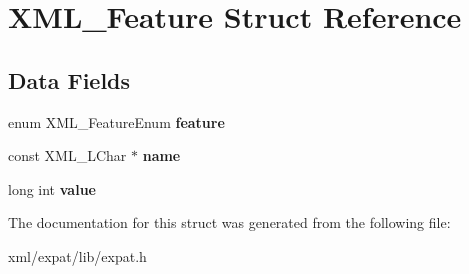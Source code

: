 \hypertarget{struct_x_m_l___feature}{\section{X\-M\-L\-\_\-\-Feature Struct Reference}
\label{struct_x_m_l___feature}
}
\subsection*{Data Fields}
\begin{DoxyCompactItemize}
\item 
\hypertarget{struct_x_m_l___feature_ae66421def7745a794da86612a9464b48}{enum X\-M\-L\-\_\-\-Feature\-Enum {\bfseries feature}}\label{struct_x_m_l___feature_ae66421def7745a794da86612a9464b48}

\item 
\hypertarget{struct_x_m_l___feature_a0c69fbed3789a944a6c9168b1a6e5add}{const X\-M\-L\-\_\-\-L\-Char $\ast$ {\bfseries name}}\label{struct_x_m_l___feature_a0c69fbed3789a944a6c9168b1a6e5add}

\item 
\hypertarget{struct_x_m_l___feature_a4d50cc5cb43a39f49435d0e81a4189dd}{long int {\bfseries value}}\label{struct_x_m_l___feature_a4d50cc5cb43a39f49435d0e81a4189dd}

\end{DoxyCompactItemize}


The documentation for this struct was generated from the following file\-:\begin{DoxyCompactItemize}
\item 
xml/expat/lib/expat.\-h\end{DoxyCompactItemize}
